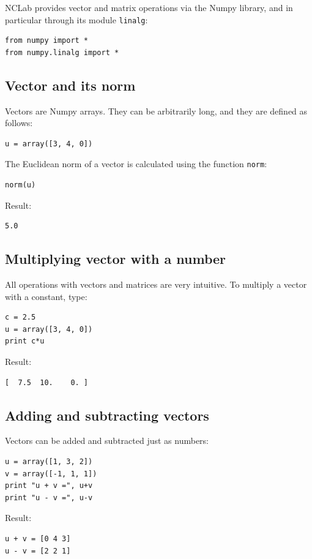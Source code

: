 \documentclass[article,A4,12pt]{llncs}
\begin{document}
NCLab provides vector and matrix operations via the Numpy library,
and in particular through its module {\tt linalg}:

\begin{verbatim}
from numpy import *
from numpy.linalg import *
\end{verbatim}

\subsection{Vector and its norm}

Vectors are Numpy arrays. They can be arbitrarily long, and they
are defined as follows: 
\begin{verbatim}
u = array([3, 4, 0])
\end{verbatim}
The Euclidean norm of a vector is calculated using the function {\tt norm}:
\begin{verbatim}
norm(u)
\end{verbatim}
Result:
\begin{verbatim}
5.0
\end{verbatim}

\subsection{Multiplying vector with a number}

All operations with vectors and matrices are very intuitive. To multiply 
a vector with a constant, type:

\begin{verbatim}
c = 2.5
u = array([3, 4, 0])
print c*u
\end{verbatim}
Result:
\begin{verbatim}
[  7.5  10.    0. ]
\end{verbatim}

\subsection{Adding and subtracting vectors}

Vectors can be added and subtracted just as numbers:

\begin{verbatim}
u = array([1, 3, 2])
v = array([-1, 1, 1])
print "u + v =", u+v
print "u - v =", u-v
\end{verbatim}
Result:
\begin{verbatim}
u + v = [0 4 3]
u - v = [2 2 1]
\end{verbatim}
\end{document}
